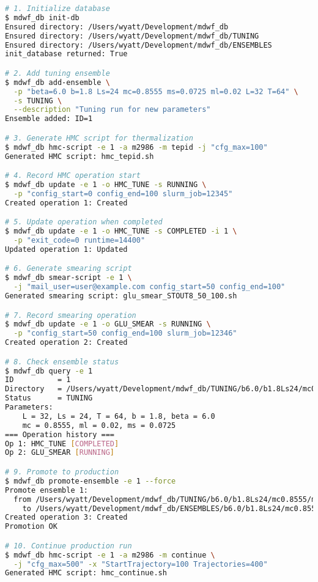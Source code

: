 \documentclass{article}
\begin{document}
\begin{lstlisting}[language=bash, caption=Complete Workflow Example]
# 1. Initialize database
$ mdwf_db init-db
Ensured directory: /Users/wyatt/Development/mdwf_db
Ensured directory: /Users/wyatt/Development/mdwf_db/TUNING
Ensured directory: /Users/wyatt/Development/mdwf_db/ENSEMBLES
init_database returned: True

# 2. Add tuning ensemble
$ mdwf_db add-ensemble \
  -p "beta=6.0 b=1.8 Ls=24 mc=0.8555 ms=0.0725 ml=0.02 L=32 T=64" \
  -s TUNING \
  --description "Tuning run for new parameters"
Ensemble added: ID=1

# 3. Generate HMC script for thermalization
$ mdwf_db hmc-script -e 1 -a m2986 -m tepid -j "cfg_max=100"
Generated HMC script: hmc_tepid.sh

# 4. Record HMC operation start
$ mdwf_db update -e 1 -o HMC_TUNE -s RUNNING \
  -p "config_start=0 config_end=100 slurm_job=12345"
Created operation 1: Created

# 5. Update operation when completed
$ mdwf_db update -e 1 -o HMC_TUNE -s COMPLETED -i 1 \
  -p "exit_code=0 runtime=14400"
Updated operation 1: Updated

# 6. Generate smearing script
$ mdwf_db smear-script -e 1 \
  -j "mail_user=user@example.com config_start=50 config_end=100"
Generated smearing script: glu_smear_STOUT8_50_100.sh

# 7. Record smearing operation
$ mdwf_db update -e 1 -o GLU_SMEAR -s RUNNING \
  -p "config_start=50 config_end=100 slurm_job=12346"
Created operation 2: Created

# 8. Check ensemble status
$ mdwf_db query -e 1
ID          = 1
Directory   = /Users/wyatt/Development/mdwf_db/TUNING/b6.0/b1.8Ls24/mc0.8555/ms0.0725/ml0.02/L32/T64
Status      = TUNING
Parameters:
    L = 32, Ls = 24, T = 64, b = 1.8, beta = 6.0
    mc = 0.8555, ml = 0.02, ms = 0.0725
=== Operation history ===
Op 1: HMC_TUNE [COMPLETED]
Op 2: GLU_SMEAR [RUNNING]

# 9. Promote to production
$ mdwf_db promote-ensemble -e 1 --force
Promote ensemble 1:
  from /Users/wyatt/Development/mdwf_db/TUNING/b6.0/b1.8Ls24/mc0.8555/ms0.0725/ml0.02/L32/T64
    to /Users/wyatt/Development/mdwf_db/ENSEMBLES/b6.0/b1.8Ls24/mc0.8555/ms0.0725/ml0.02/L32/T64
Created operation 3: Created
Promotion OK

# 10. Continue production run
$ mdwf_db hmc-script -e 1 -a m2986 -m continue \
  -j "cfg_max=500" -x "StartTrajectory=100 Trajectories=400"
Generated HMC script: hmc_continue.sh
\end{lstlisting}
\end{document}
